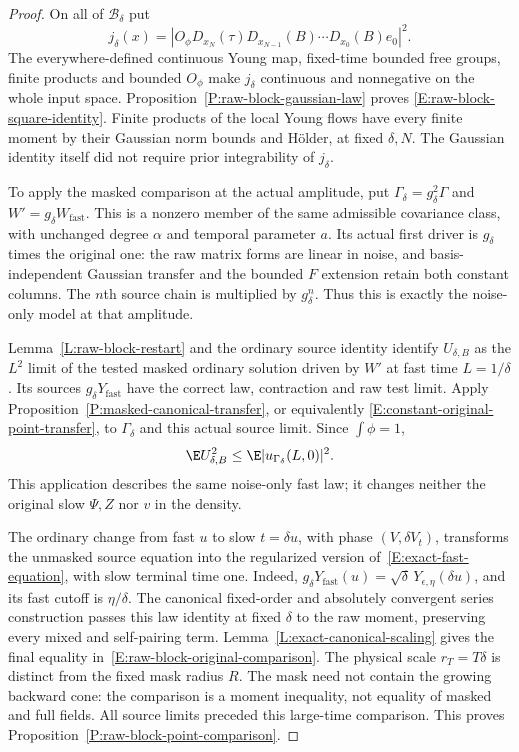 \begin{proof}
  On all of $\mathscr B_\delta$ put
  \[
    j_\delta(x)=
    |O_\phi D_{x_N}(\tau)D_{x_{N-1}}(B)\cdots D_{x_0}(B)e_0|^2.
  \]
  The everywhere-defined continuous Young map, fixed-time bounded
  free groups, finite products and bounded $O_\phi$ make $j_\delta$
  continuous and nonnegative on the whole input space.
  Proposition~\ref{P:raw-block-gaussian-law} proves
  \eqref{E:raw-block-square-identity}. Finite products of the local
  Young flows have every finite moment by their Gaussian norm bounds
  and H\"older, at fixed $\delta,N$. The Gaussian identity itself
  did not require prior integrability of $j_\delta$.

  To apply the masked comparison at the actual amplitude, put
  $\Gamma_\delta=g_\delta^2\Gamma$ and
  $W'=g_\delta W_{\mathrm{fast}}$.
  This is a nonzero member of the same admissible covariance class,
  with unchanged degree $\alpha$ and temporal parameter $a$.
  Its actual first driver is $g_\delta$ times the original one:
  the raw matrix forms are linear in noise, and basis-independent
  Gaussian transfer and the bounded $F$ extension retain both
  constant columns. The $n$th source chain is multiplied by
  $g_\delta^n$. Thus this is exactly the noise-only model at that
  amplitude.

  Lemma~\ref{L:raw-block-restart} and the ordinary source identity
  identify $U_{\delta,B}$ as the $L^2$ limit of the tested masked
  ordinary solution driven by $W'$ at fast time $L=1/\delta$.
  Its sources $g_\delta Y_{\mathrm{fast}}$ have the correct law,
  contraction and raw test limit. Apply
  Proposition~\ref{P:masked-canonical-transfer}, or equivalently
  \eqref{E:constant-original-point-transfer}, to $\Gamma_\delta$
  and this actual source limit. Since $\int\phi=1$,
  \[
    \E U_{\delta,B}^2
    \le\E|u_{\Gamma_\delta}(L,0)|^2.
  \]
  This application describes the same noise-only fast law; it
  changes neither the original slow $\Psi,Z$ nor $v$ in the density.

  The ordinary change from fast $u$ to slow $t=\delta u$, with
  phase $(V,\delta V_t)$, transforms the unmasked source equation
  into the regularized version of~\eqref{E:exact-fast-equation},
  with slow terminal time one. Indeed,
  $g_\delta Y_{\mathrm{fast}}(u)
  =\sqrt\delta\,Y_{\epsilon,\eta}(\delta u)$,
  and its fast cutoff is $\eta/\delta$.
  The canonical fixed-order and absolutely convergent series
  construction passes this law identity at fixed $\delta$ to the
  raw moment, preserving every mixed and self-pairing term.
  Lemma~\ref{L:exact-canonical-scaling} gives the final equality
  in~\eqref{E:raw-block-original-comparison}.
  The physical scale $r_T=T\delta$ is distinct from the fixed
  mask radius $R$. The mask need not contain the growing backward
  cone: the comparison is a moment inequality, not equality of
  masked and full fields. All source limits preceded this large-time
  comparison.
  This proves Proposition~\ref{P:raw-block-point-comparison}.
\end{proof}

